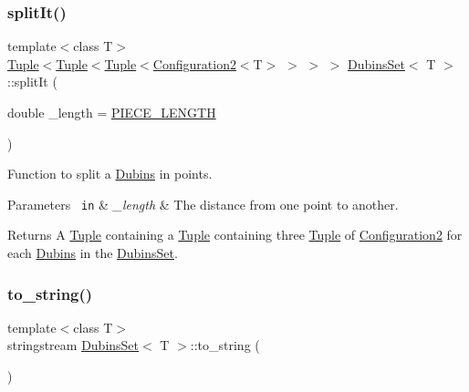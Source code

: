 \subsubsection{\texorpdfstring{splitIt()}{splitIt()}}
{\footnotesize\ttfamily template$<$class T$>$ \\
\mbox{\hyperlink{class_tuple}{Tuple}}$<$\mbox{\hyperlink{class_tuple}{Tuple}}$<$\mbox{\hyperlink{class_tuple}{Tuple}}$<$\mbox{\hyperlink{class_configuration2}{Configuration2}}$<$T$>$ $>$ $>$ $>$ \mbox{\hyperlink{class_dubins_set}{Dubins\+Set}}$<$ T $>$\+::split\+It (\begin{DoxyParamCaption}\item[{double}]{\+\_\+length = {\ttfamily \mbox{\hyperlink{dubins_8hh_a5b2500ca93a5100f73dc442d3cfea7d4}{P\+I\+E\+C\+E\+\_\+\+L\+E\+N\+G\+TH}}} }\end{DoxyParamCaption})\hspace{0.3cm}{\ttfamily [inline]}}

Function to split a \mbox{\hyperlink{class_dubins}{Dubins}} in points. 
\begin{DoxyParams}[1]{Parameters}
\mbox{\texttt{ in}}  & {\em \+\_\+length} & The distance from one point to another. \\
\hline
\end{DoxyParams}
\begin{DoxyReturn}{Returns}
A {\ttfamily \mbox{\hyperlink{class_tuple}{Tuple}}} containing a {\ttfamily \mbox{\hyperlink{class_tuple}{Tuple}}} containing three {\ttfamily \mbox{\hyperlink{class_tuple}{Tuple}}} of {\ttfamily \mbox{\hyperlink{class_configuration2}{Configuration2}}} for each \mbox{\hyperlink{class_dubins}{Dubins}} in the \mbox{\hyperlink{class_dubins_set}{Dubins\+Set}}. 
\end{DoxyReturn}
\mbox{\label{class_dubins_set_acfedfbe0ef1ff445cbaff93c70205f86}} 
\subsubsection{\texorpdfstring{to\_string()}{to\_string()}}
{\footnotesize\ttfamily template$<$class T$>$ \\
stringstream \mbox{\hyperlink{class_dubins_set}{Dubins\+Set}}$<$ T $>$\+::to\+\_\+string (\begin{DoxyParamCaption}{ }\end{DoxyParamCaption})\hspace{0.3cm}{\ttfamily [inline]}}


